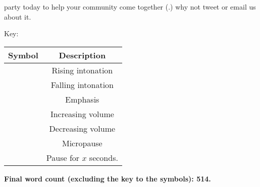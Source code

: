 \documentclass{article}
\begin{document}
party today to help your community come together (.) why not tweet or email us about it.

\begin{center}

	Key:
	\begin{tabular}{| c | c |}
	\hline
	\textbf{Symbol} & \textbf{Description}\\
	\hline
	& Rising intonation\\
	\hline
	& Falling intonation\\
	\hline
	& Emphasis\\
	\hline
	& Increasing volume\\
	\hline
	& Decreasing volume\\
	\hline
	& Micropause\\
	\hline
	& Pause for $x$ seconds.\\
	\hline
	\end{tabular}

	\textbf{Final word count (excluding the key to the symbols): 514.}

\end{center}
\end{document}
